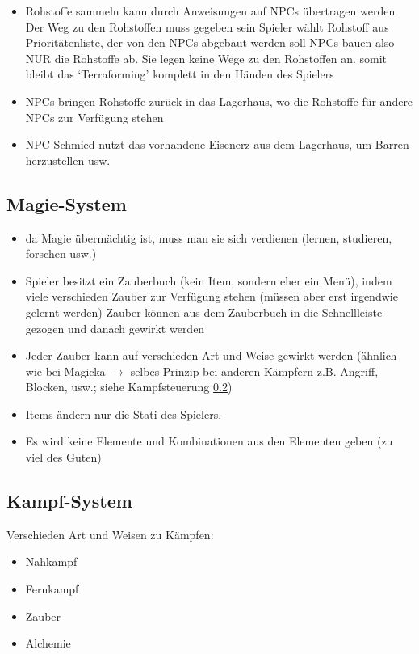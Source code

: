	\begin{itemize}
		\item Rohstoffe sammeln kann durch Anweisungen auf NPCs übertragen werden 
		\subitem Der Weg zu den Rohstoffen muss gegeben sein
		\subitem Spieler wählt Rohstoff aus Prioritätenliste, der von den NPCs abgebaut werden soll
		\subitem NPCs bauen also NUR die Rohstoffe ab. Sie legen keine Wege zu den Rohstoffen an.
		\subitem somit bleibt das `Terraforming' komplett in den Händen des Spielers
		\item NPCs bringen Rohstoffe zurück in das Lagerhaus, wo die Rohstoffe für andere NPCs zur Verfügung stehen
		\item NPC Schmied nutzt das vorhandene Eisenerz aus dem Lagerhaus, um Barren herzustellen usw.
	\end{itemize}

\subsection{Magie-System}
\label{subsec:magie-system}
	\begin{itemize}
		\item da Magie übermächtig ist, muss man sie sich verdienen (lernen, studieren, forschen usw.)
		\item Spieler besitzt ein Zauberbuch (kein Item, sondern eher ein Menü), indem viele verschieden Zauber zur Verfügung stehen (müssen aber erst irgendwie gelernt werden)
		\subitem Zauber können aus dem Zauberbuch in die Schnellleiste gezogen und danach gewirkt werden
		\item Jeder Zauber kann auf verschieden Art und Weise gewirkt werden (ähnlich wie bei Magicka $\rightarrow$ selbes Prinzip bei anderen Kämpfern z.B. Angriff, Blocken, usw.; siehe Kampfsteuerung \ref{subsec:kamp-system})
		\item Items ändern nur die Stati des Spielers.
		\item Es wird keine Elemente und Kombinationen aus den Elementen geben (zu viel des Guten)
	\end{itemize}

\subsection{Kampf-System}
\label{subsec:kamp-system}
Verschieden Art und Weisen zu Kämpfen:
	\begin{itemize}
		\item Nahkampf
		\item Fernkampf
		\item Zauber
		\item Alchemie
	\end{itemize}

